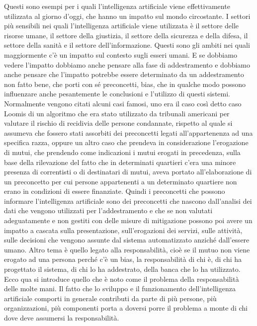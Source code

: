 Questi sono esempi per i quali l'intelligenza artificiale viene effettivamente utilizzata al giorno d'oggi, che hanno un impatto sul mondo circostante.
I settori più sensibili nei quali l'intelligenza artificiale viene utilizzata è il settore delle risorse umane, il settore della giustizia, il settore della sicurezza e della difesa, il settore della sanità e il settore dell'informazione.
Questi sono gli ambiti nei quali maggiormente c'è un impatto sul contesto sugli esseri umani.
E se dobbiamo vedere l'impatto dobbiamo anche pensare alla fase di addestramento e dobbiamo anche pensare che l'impatto potrebbe essere determinato da un addestramento non fatto bene, che porti con sé preconcetti, bias, che in qualche modo possono influenzare anche pesantemente le conclusioni e l'utilizzo di questi sistemi.
Normalmente vengono citati alcuni casi famosi, uno era il caso così detto caso Loomis di un algoritmo che era stato utilizzato da tribunali americani per valutare il rischio di recidivia delle persone condannate, rispetto al quale si assumeva che fossero stati assorbiti dei preconcetti legati all'appartenenza ad una specifica razza, oppure un altro caso che prendeva in considerazione l'erogazione di mutui, che prendendo come indicazioni i mutui erogati in precedenza, sulla base della rilevazione del fatto che in determinati quartieri c'era una minore presenza di correntisti o di destinatari di mutui, aveva portato all'elaborazione di un preconcetto per cui persone appartenenti a un determinato quartiere non erano in condizioni di essere finanziate.
Quindi i preconcetti che possono informare l'intelligenza artificiale sono dei preconcetti che nascono dall'analisi dei dati che vengono utilizzati per l'addestramento e che se non valutati adeguatamente e non gestiti con delle misure di mitigazione possono poi avere un impatto a cascata sulla presentazione, sull'erogazioni dei servizi, sulle attività, sulle decisioni che vengono assunte dal sistema automatizzato anziché dall'essere umano.
Altro tema è quello legato alla responsabilità, cioè se il mutuo non viene erogato ad una persona perché c'è un bias, la responsabilità di chi è, di chi ha progettato il sistema, di chi lo ha addestrato, della banca che lo ha utilizzato.
Ecco qua si introduce quello che è noto come il problema della responsabilità delle molte mani.
Il fatto che lo sviluppo e il funzionamento dell'intelligenza artificiale comporti in generale contributi da parte di più persone, più organizzazioni, più componenti porta a doversi porre il problema a monte di chi dove deve assumersi la responsabilità.
